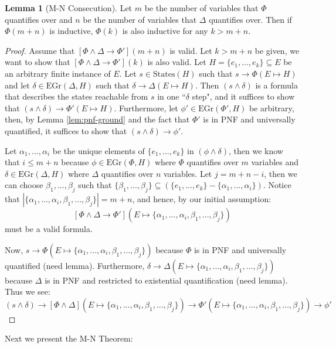 \documentclass[12pt]{article}
\theoremstyle{definition}
\newtheorem{lemma}{Lemma}
\theoremstyle{remark}
\newcommand{\states}{\text{States}}
\newcommand{\gr}{\text{EGr}}
\begin{document}
\begin{lemma}[M-N Consecution]
  Let $m$ be the number of variables that $\Phi$ quantifies over and $n$ be the number of variables that $\Delta$ quantifies over.  Then if $\Phi(m+n)$ is inductive, $\Phi(k)$ is also inductive for any $k>m+n$.
\end{lemma}
\begin{proof}
  Assume that $[\Phi\land\Delta \rightarrow \Phi'](m+n)$ is valid.  Let $k>m+n$ be given, we want to show that $[\Phi\land\Delta \rightarrow \Phi'](k)$ is also valid.  Let $H = \{e_1,...,e_k\} \subseteq E$ be an arbitrary finite instance of $E$.  Let $s \in \states(H)$ such that $s \rightarrow \Phi(E \mapsto H)$ and let $\delta \in \gr(\Delta,H)$ such that $\delta \rightarrow \Delta(E \mapsto H)$.  Then $(s \land \delta)$ is a formula that describes the states reachable from $s$ in one ``$\delta$ step", and it suffices to show that $(s \land \delta) \rightarrow \Phi'(E \mapsto H)$.  Furthermore, let $\phi' \in \gr(\Phi',H)$ be arbitrary, then, by Lemma \ref{lem:pnf-ground} and the fact that $\Phi'$ is in PNF and universally quantified, it suffices to show that $(s \land \delta) \rightarrow \phi'$.

  Let $\alpha_1,...,\alpha_i$ be the unique elements of $\{e_1,...,e_k\}$ in $(\phi \land \delta)$, then we know that $i \leq m+n$ because $\phi \in \gr(\Phi,H)$ where $\Phi$ quantifies over $m$ variables and $\delta \in \gr(\Delta,H)$ where $\Delta$ quantifies over $n$ variables.  Let $j = m+n-i$, then we can choose $\beta_1,...,\beta_j$ such that $\{\beta_1,...,\beta_j\} \subseteq (\{e_1,...,e_k\}-\{\alpha_1,...,\alpha_i\})$.  Notice that $|\{\alpha_1,...,\alpha_i,\beta_1,...,\beta_j\}|=m+n$, and hence, by our initial assumption:
  $$[\Phi\land\Delta \rightarrow \Phi'](E \mapsto \{\alpha_1,...,\alpha_i,\beta_1,...,\beta_j\})$$
  must be a valid formula.

  Now, $s \rightarrow \Phi(E \mapsto \{\alpha_1,...,\alpha_i,\beta_1,...,\beta_j\})$ because $\Phi$ is in PNF and universally quantified (need lemma).  Furthermore, $\delta \rightarrow \Delta(E \mapsto \{\alpha_1,...,\alpha_i,\beta_1,...,\beta_j\})$ because $\Delta$ is in PNF and restricted to existential quantification (need lemma).  Thus we see:
  $$(s \land \delta) \rightarrow [\Phi\land\Delta](E \mapsto \{\alpha_1,...,\alpha_i,\beta_1,...,\beta_j\}) \rightarrow \Phi'(E \mapsto \{\alpha_1,...,\alpha_i,\beta_1,...,\beta_j\}) \rightarrow \phi'$$
\end{proof}

Next we present the M-N Theorem:
\end{document}
